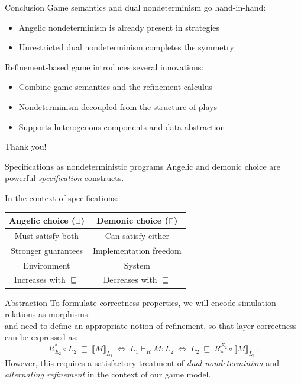 \documentclass[aspectratio=54]{beamer}
\begin{document}
\begin{frame}{Conclusion}
  Game semantics and dual nondeterminism go hand-in-hand:
  \begin{itemize}
    \item Angelic nondeterminism is already present in strategies
    \item Unrestricted dual nondeterminism completes the symmetry
  \end{itemize}

  Refinement-based game introduces several innovations:
  \begin{itemize}
    \item Combine game semantics and the refinement calculus
    \item Nondeterminism decoupled from the structure of plays
    \item Supports heterogenous components and data abstraction
  \end{itemize}
\end{frame}


\begin{frame}{}
  \begin{center}
    Thank you!
  \end{center}
\end{frame}


\appendix %

\begin{frame}{Specifications as nondeterministic programs} %
  Angelic and demonic choice are powerful
  \emph{specification} constructs.

  \pause
  In the context of specifications:
  \begin{center}
    \begin{tabular}{cc}
      \hline
      Angelic choice ($\sqcup$) & Demonic choice ($\sqcap$) \\
      \hline
      Must satisfy both & Can satisfy either \\
      Stronger guarantees & Implementation freedom \\
      Environment & System \\
      Increases with $\sqsubseteq$ & Decreases with $\sqsubseteq$ \\
      \hline
    \end{tabular}
  \end{center}
\end{frame}

\begin{frame}{Abstraction} %
To formulate correctness properties,
we will encode simulation relations as morphisms:
\[
\]
and need to define an appropriate notion of refinement,
so that layer correctness can be expressed as:
\[
  R^*_{E_2} \!\circ L_2 \: \sqsubseteq \: \llbracket M \rrbracket_{L_1}
  \: \Leftrightarrow \:
  L_1 \vdash_R M : L_2
  \: \Leftrightarrow \:
  L_2 \: \sqsubseteq \: R_*^{E_2} \!\circ \llbracket M \rrbracket_{L_1} \,.
\]
However,
this requires a satisfactory treatment
of \emph{dual nondeterminism} and
\emph{alternating refinement}
in the context of our game model.
\end{frame}
\end{document}
